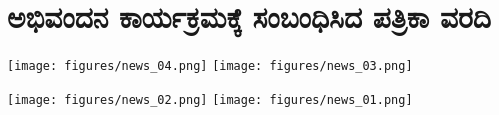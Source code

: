 {\fontsize{14}{16}\selectfont
\chapter{ಅಭಿವಂದನ ಕಾರ್ಯಕ್ರಮಕ್ಕೆ  ಸಂಬಂಧಿಸಿದ ಪತ್ರಿಕಾ ವರದಿ}

\texttt{[image: figures/news\_04.png]}\qquad
\hbox{\raise 16pt\hbox{\texttt{[image: figures/news\_03.png]}}}
\bigskip

\noindent
\texttt{[image: figures/news\_02.png]}\qquad
\hbox{\raise 35pt\hbox{\texttt{[image: figures/news\_01.png]}}}


}
